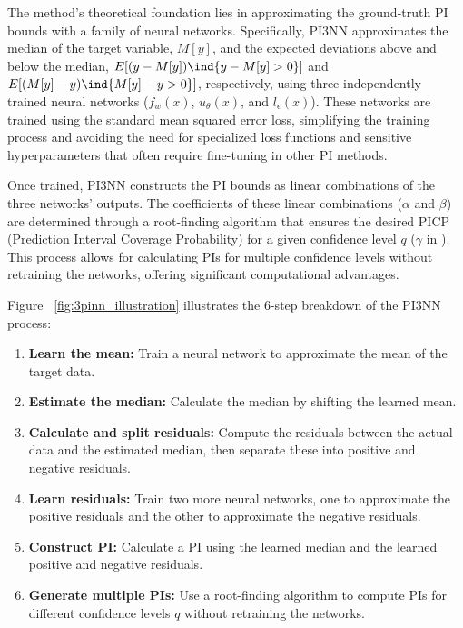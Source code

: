 The method's theoretical foundation lies in approximating the ground-truth PI bounds with a family of neural networks. Specifically, PI3NN approximates the median of the target variable, $M[y]$, and the expected deviations above and below the median, $E[(y - M[y]) \ind{y-M[y]>0}]$ and $E[(M[y] - y) \ind{M[y]-y>0}]$, respectively, using three independently trained neural networks ($f_w(x)$, $u_\theta(x)$, and $l_\epsilon(x)$). These networks are trained using the standard mean squared error loss, simplifying the training process and avoiding the need for specialized loss functions and sensitive hyperparameters that often require fine-tuning in other PI methods.

Once trained, PI3NN constructs the PI bounds as linear combinations of the three networks' outputs. The coefficients of these linear combinations ($\alpha$ and $\beta$) are determined through a root-finding algorithm that ensures the desired PICP (Prediction Interval Coverage Probability) for a given confidence level $q$ ($\gamma$ in \cite{pi3nn}). This process allows for calculating PIs for multiple confidence levels without retraining the networks, offering significant computational advantages.


Figure ~\vref{fig:3pinn_illustration} illustrates the 6-step breakdown of the PI3NN process:
\begin{enumerate}
    \item \textbf{Learn the mean:} Train a neural network to approximate the mean of the target data.
    \item \textbf{Estimate the median:} Calculate the median by shifting the learned mean.
    \item \textbf{Calculate and split residuals:} Compute the residuals between the actual data and the estimated median, then separate these into positive and negative residuals.
    \item \textbf{Learn residuals:} Train two more neural networks, one to approximate the positive residuals and the other to approximate the negative residuals.
    \item \textbf{Construct PI:} Calculate a PI using the learned median and the learned positive and negative residuals.
    \item \textbf{Generate multiple PIs:} Use a root-finding algorithm to compute PIs for different confidence levels $q$ without retraining the networks.
\end{enumerate}


